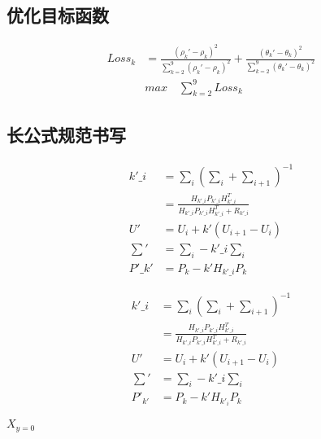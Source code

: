 \documentclass[withoutpreface,bwprint]{cumcmthesis}  %
\begin{document}
	\subsection{优化目标函数}
	
			\begin{equation}
			\begin{split}
				Loss_{k} & = \frac{(\rho_{k}' - \rho_{k})^{2}}{\sum_{k=2}^{9}(\rho_{k}' - \rho_{k})^{2}} + \frac{(\theta_{k}' - \theta_{k})^{2}}{\sum_{k=2}^{9}(\theta_{k}' - \theta_{k})^{2}}  \\
				&max\quad\sum_{k=2}^{9}Loss_{k}
			\end{split}
		\end{equation}	
	
	\subsection{长公式规范书写}
	
		\begin{equation}
		\tag{不规范}
		\begin{split}
			k'\_{i}&= \sum_{i}( \sum_{i}+ \sum_{i+1})^{-1}\\
			&=\frac{H_{k'\_{i}}P_{k'\_{i}}H_{k'\_{i}}^{T}}{H_{k'\_{i}}P_{k'\_{i}}H_{k'\_{i}}^{T}+R_{k'\_{i}}} \\
			U'&= U_{i}+ k'(U_{i+1}- U_{i}) \\
			\sum'& = \sum_{i} - k'\_{i}\sum_{i} \\
			P'\_{k'}& =P_{k}-k'H_{k'\_{i}}P_{k}
		\end{split}
	\end{equation}


		\begin{equation}
			\tag{规范}
			\begin{split}
				k'\_{i}&= \sum_{i}( \sum_{i}+ \sum_{i+1})^{-1}
				\\
				       &=\frac{H_{k'\_{i}}P_{k'\_{i}}H_{k'\_{i}}^{T}}{H_{k'\_{i}}P_{k'\_{i}}H_{k'\_{i}}^{T}+R_{k'\_{i}}} \\
			      	U'&= U_{i}+ k'(U_{i+1}- U_{i}) 
			      	\\
				\sum'& = \sum_{i} - k'\_{i}\sum_{i}
				 \\
			  P'_{k'}& =P_{k}-k'H_{k'_{i}}P_{k}
			\end{split}
		\end{equation}
	
	$X_{y=0}$
	
	\newpage
	
\end{document}
